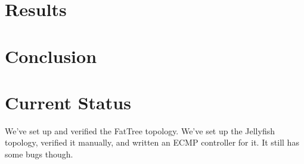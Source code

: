 \documentclass{acm_proc_article-sp}
\begin{document}
\section{Results}
\section{Conclusion}
\section{Current Status}
We've set up and verified the FatTree topology. We've set up the Jellyfish topology, verified it manually, and written an ECMP controller for it. It still has some bugs though.




\balancecolumns
\end{document}
